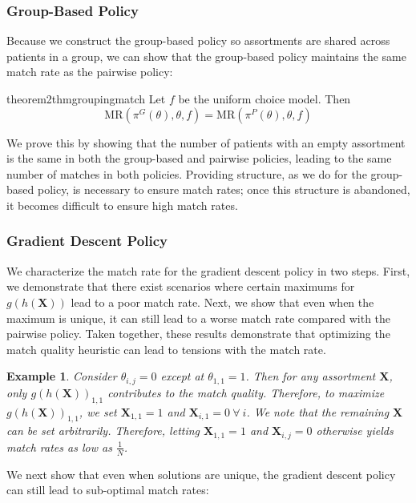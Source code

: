 \documentclass[11pt]{article}
\newtheorem{example}{Example}[section]
\begin{document}
\subsubsection{Group-Based Policy}
\label{sec:group_match_rate}
Because we construct the group-based policy so assortments are shared across patients in a group, we can show that the group-based policy maintains the same match rate as the pairwise policy:

\begin{restatable}{theorem2}{thmgroupingmatch}
    \label{thm:grouping_match}
    Let $f$ be the uniform choice model. Then 
    \begin{equation}
        \mathrm{MR}(\pi^{G}(\theta),\theta,f) = \mathrm{MR}(\pi^{P}(\theta),\theta,f)
    \end{equation}    
\end{restatable}

We prove this by showing that the number of patients with an empty assortment is the same in both the group-based and pairwise policies, leading to the same number of matches in both policies. 
Providing structure, as we do for the group-based policy, is necessary to ensure match rates; once this structure is abandoned, it becomes difficult to ensure high match rates. 

\subsubsection{Gradient Descent Policy}
We characterize the match rate for the gradient descent policy in two steps. 
First, we demonstrate that there exist scenarios where certain maximums for $g(h(\mathbf{X}))$ lead to a poor match rate.
Next, we show that even when the maximum is unique, it can still lead to a worse match rate compared with the pairwise policy. 
Taken together, these results demonstrate that optimizing the match quality heuristic can lead to tensions with the match rate. 
\begin{example}
    Consider $\theta_{i,j} = 0$ except at $\theta_{1,1} = 1$. 
    Then for any assortment $\mathbf{X}$, only $g(h(\mathbf{X}))_{1,1}$ contributes to the match quality. 
    Therefore, to maximize $g(h(\mathbf{X}))_{1,1}$, we set $\mathbf{X}_{1,1} = 1$ and $\mathbf{X}_{i,1} = 0 \ \forall \ i$. 
    We note that the remaining $\mathbf{X}$ can be set arbitrarily.
    Therefore, letting $\mathbf{X}_{1,1} = 1$ and $\mathbf{X}_{i,j} = 0$ otherwise yields match rates as low as $\frac{1}{N}$. 
\end{example}
We next show that even when solutions are unique, the gradient descent policy can still lead to sub-optimal match rates: 
\end{document}
